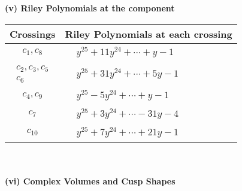 \documentclass[1p]{elsarticle_modified}
\theoremstyle{definition}
\begin{document}
\newpage\renewcommand{\arraystretch}{1}
\flushleft \textbf{(v) Riley Polynomials at the component}\newline \\
\begin{tabular}{m{50pt}|m{274pt}}
Crossings & \hspace{64pt}Riley Polynomials at each crossing \\
\hline $$\begin{aligned}c_{1},c_{8}\end{aligned}$$&$\begin{aligned}
&y^{25}+11 y^{24}+\cdots+y-1
\end{aligned}$\\
\hline $$\begin{aligned}c_{2},c_{3},c_{5}\\c_{6}\end{aligned}$$&$\begin{aligned}
&y^{25}+31 y^{24}+\cdots+5 y-1
\end{aligned}$\\
\hline $$\begin{aligned}c_{4},c_{9}\end{aligned}$$&$\begin{aligned}
&y^{25}-5 y^{24}+\cdots+y-1
\end{aligned}$\\
\hline $$\begin{aligned}c_{7}\end{aligned}$$&$\begin{aligned}
&y^{25}+3 y^{24}+\cdots-31 y-4
\end{aligned}$\\
\hline $$\begin{aligned}c_{10}\end{aligned}$$&$\begin{aligned}
&y^{25}+7 y^{24}+\cdots+21 y-1
\end{aligned}$\\
\hline
\end{tabular}\\~\\
\newpage\flushleft \textbf{(vi) Complex Volumes and Cusp Shapes}
\end{document}
